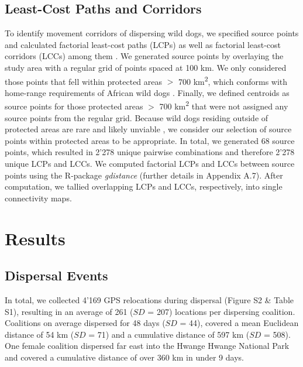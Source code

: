 \documentclass[abstract=on,10pt,a4paper,bibliography=totocnumbered]{article}
\begin{document}
\subsection{Least-Cost Paths and Corridors}
To identify movement corridors of dispersing wild dogs, we specified source
points and calculated factorial least-cost paths (LCPs) as well as factorial
least-cost corridors (LCCs) among them \citep{Elliot.2014}. We generated source
points by overlaying the study area with a regular grid of points spaced at 100
km. We only considered those points that fell within protected areas \(>\) 700
km\textsuperscript{2}, which conforms with home-range requirements of African
wild dogs \citep{Pomilia.2015}. Finally, we defined centroids as source points
for those protected areas \(>\) 700 km\textsuperscript{2} that were not assigned
any source points from the regular grid. Because wild dogs residing outside of
protected areas are rare and likely unviable \citep{VanDerMeer.2014}, we
consider our selection of source points within protected areas to be
appropriate. In total, we generated 68 source points, which resulted in 2'278
unique pairwise combinations and therefore 2'278 unique LCPs and LCCs. We
computed factorial LCPs and LCCs between source points using the R-package
\textit{gdistance} (further details in Appendix A.7). After computation, we
tallied overlapping LCPs and LCCs, respectively, into single connectivity maps.

\section{Results}
\subsection{Dispersal Events}
In total, we collected 4'169 GPS relocations during dispersal (Figure S2 \&
Table S1), resulting in an average of 261 (\(SD\) = 207) locations per
dispersing coalition. Coalitions on average dispersed for 48 days (\(SD\) = 44),
covered a mean Euclidean distance of 54 km (\(SD\) = 71) and a cumulative
distance of 597 km (\(SD\) = 508). One female coalition dispersed far east into
the Hwange Hwange National Park and covered a cumulative distance of over 360 km
in under 9 days.
\end{document}
